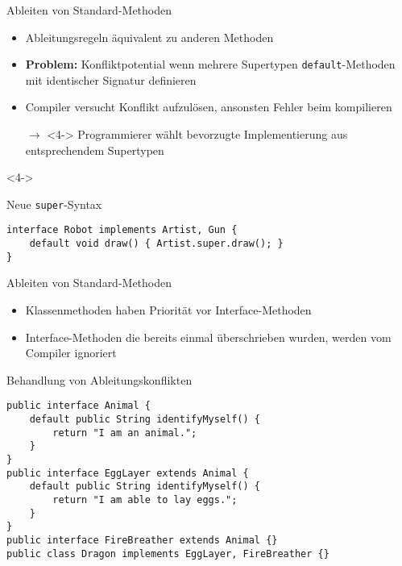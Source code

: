 \begin{frame}[fragile]{Ableiten von Standard-Methoden}
    \begin{itemize}
        \item<1-> Ableitungsregeln äquivalent zu anderen Methoden
        \item<2-> \textbf{Problem:} Konfliktpotential wenn mehrere Supertypen 
        \texttt{default}-Methoden mit identischer Signatur definieren
        \item<3-> Compiler versucht Konflikt aufzulösen, ansonsten Fehler beim kompilieren
        \item[$\rightarrow$]<4-> Programmierer wählt bevorzugte Implementierung aus entsprechendem 
        Supertypen  
    \end{itemize}

    \begin{onlyenv}<4->
        \begin{center}
            \begin{minipage}[b]{0.75\textwidth}
                \begin{block}{Neue \texttt{super}-Syntax \citep{goetz13}}
                    \begin{lstlisting}
interface Robot implements Artist, Gun {
    default void draw() { Artist.super.draw(); }
}
                    \end{lstlisting}
                \end{block}
            \end{minipage}
        \end{center}
    \end{onlyenv}
\end{frame}


\begin{frame}[fragile]{Ableiten von Standard-Methoden}
    \begin{itemize}
        \item Klassenmethoden haben Priorität vor Interface-Methoden \pause
        \item Interface-Methoden die bereits einmal überschrieben wurden, werden vom
        Compiler ignoriert \pause
    \end{itemize}

    \begin{center}
        \begin{minipage}[b]{0.75\textwidth}
            \begin{block}{Behandlung von Ableitungskonflikten \citep{Gallardo14}}
                \begin{lstlisting}  
public interface Animal {
    default public String identifyMyself() {
        return "I am an animal.";
    }
}
public interface EggLayer extends Animal {
    default public String identifyMyself() {
        return "I am able to lay eggs.";
    }
}
public interface FireBreather extends Animal {}
public class Dragon implements EggLayer, FireBreather {}
                \end{lstlisting}
            \end{block}
        \end{minipage}
    \end{center}
\end{frame}

